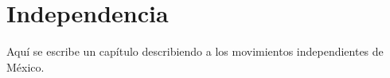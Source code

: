 \chapter{Independencia}
\label{chapter:Independencia}

Aquí se escribe un capítulo describiendo a los movimientos independientes de México.